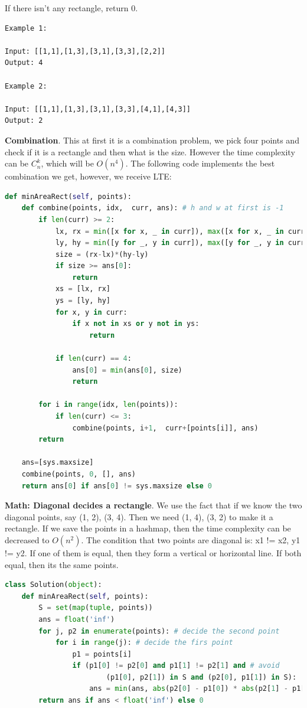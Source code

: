 \documentclass[../main.tex]{subfiles}
\begin{document}
If there isn't any rectangle, return 0.
\begin{lstlisting}
Example 1:

Input: [[1,1],[1,3],[3,1],[3,3],[2,2]]
Output: 4

Example 2:

Input: [[1,1],[1,3],[3,1],[3,3],[4,1],[4,3]]
Output: 2
\end{lstlisting}
\textbf{Combination}. This at first it is a combination problem, we pick four points and check if it is a rectangle and then what is the size. However the time complexity can be $C_n^k$, which will be $O(n^4)$. The following code implements the best combination we get, however, we receive LTE:
\begin{lstlisting}[language=Python]
def minAreaRect(self, points):
    def combine(points, idx,  curr, ans): # h and w at first is -1
        if len(curr) >= 2:
            lx, rx = min([x for x, _ in curr]), max([x for x, _ in curr])
            ly, hy = min([y for _, y in curr]), max([y for _, y in curr])
            size = (rx-lx)*(hy-ly)
            if size >= ans[0]:
                return 
            xs = [lx, rx]
            ys = [ly, hy]
            for x, y in curr:
                if x not in xs or y not in ys:
                    return 

            if len(curr) == 4:
                ans[0] = min(ans[0], size)
                return 

        for i in range(idx, len(points)):
            if len(curr) <= 3:
                combine(points, i+1,  curr+[points[i]], ans)
        return 
    
    ans=[sys.maxsize]
    combine(points, 0, [], ans)
    return ans[0] if ans[0] != sys.maxsize else 0
\end{lstlisting}
\textbf{Math: Diagonal decides a rectangle}. We use the fact that if we know the two diagonal points, say (1, 2), (3, 4). Then we need (1, 4), (3, 2) to make it a rectangle.  If we save the points in a hashmap, then the time complexity can be decreased to $O(n^2)$. The condition that two points are diagonal is: x1 != x2, y1 != y2. If one of them is equal, then they form a vertical or horizontal line. If both equal, then its the same points. 
\begin{lstlisting}[language = Python]
class Solution(object):
    def minAreaRect(self, points):
        S = set(map(tuple, points))
        ans = float('inf')
        for j, p2 in enumerate(points): # decide the second point
            for i in range(j): # decide the firs point
                p1 = points[i]
                if (p1[0] != p2[0] and p1[1] != p2[1] and # avoid
                        (p1[0], p2[1]) in S and (p2[0], p1[1]) in S):
                    ans = min(ans, abs(p2[0] - p1[0]) * abs(p2[1] - p1[1]))
        return ans if ans < float('inf') else 0
\end{lstlisting}
\end{document}
